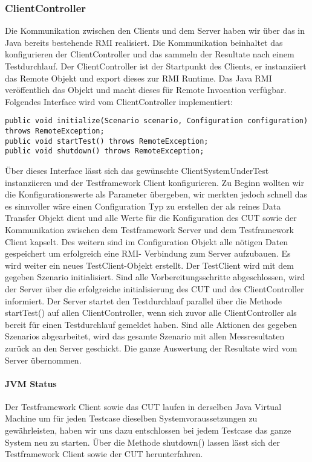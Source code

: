 \subsubsection{ClientController}
\label{sec:clientController}
Die Kommunikation zwischen den Clients und dem Server haben wir über das in Java bereits bestehende RMI realisiert. Die Kommunikation beinhaltet das konfigurieren der ClientController und das sammeln der Resultate nach einem Testdurchlauf. Der ClientController ist der Startpunkt des Clients, er instanziiert das Remote Objekt und export dieses zur RMI Runtime. Das Java RMI veröffentlich das Objekt und macht dieses für Remote Invocation verfügbar.
Folgendes Interface wird vom ClientController implementiert:
\begin{lstlisting}	
public void initialize(Scenario scenario, Configuration configuration) throws RemoteException;
public void startTest() throws RemoteException;
public void shutdown() throws RemoteException;
\end{lstlisting}
Über dieses Interface lässt sich das gewünschte ClientSystemUnderTest instanziieren und der Testframework Client konfigurieren. Zu Beginn wollten wir die Konfigurationswerte als Parameter übergeben, wir merkten jedoch schnell das es sinnvoller wäre einen Configuration Typ zu erstellen der als reines Data Transfer Objekt dient und alle Werte für die Konfiguration des CUT sowie der Kommunikation zwischen dem Testframework Server und dem Testframework Client kapselt. Des weitern sind im Configuration Objekt alle nötigen Daten gespeichert um erfolgreich eine RMI- Verbindung zum Server aufzubauen. Es wird weiter ein neues TestClient-Objekt erstellt. Der TestClient wird mit dem gegeben Szenario initialisiert. Sind alle Vorbereitungsschritte abgeschlossen, wird der Server über die erfolgreiche initialisierung des CUT und des ClientController informiert. Der Server startet den Testdurchlauf parallel über die Methode startTest() auf allen ClientController, wenn sich zuvor alle ClientController als bereit für einen Testdurchlauf gemeldet haben. Sind alle Aktionen des gegeben Szenarios abgearbeitet, wird das gesamte Szenario mit allen Messresultaten zurück an den Server geschickt. Die ganze Auswertung der Resultate wird vom Server übernommen. 

\paragraph{JVM Status} 
Der Testframework Client sowie das CUT laufen in derselben Java Virtual Machine um für jeden Testcase dieselben Systemvoraussetzungen zu gewährleisten, haben wir uns dazu entschlossen bei jedem Testcase das ganze System neu zu starten. Über die Methode shutdown() lassen lässt sich der Testframework Client sowie der CUT herunterfahren.

